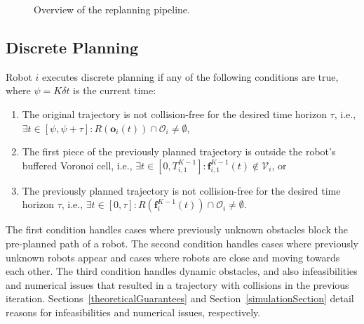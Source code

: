 \documentclass{svproc}
\newcommand{\vf}{\mathbf{f}}
\newcommand{\vo}{\mathbf{o}}
\newcommand{\cV}{\mathcal{V}}
\newcommand{\cO}{\mathcal{O}}
\begin{document}
\begin{figure}
{
}
\caption{Overview of the replanning pipeline.
}
\label{fig:flowchart}
\end{figure}

\subsection{Discrete Planning} \label{discretePlanning}
Robot $i$ executes discrete planning if any of the following conditions are true, where $\psi=K\delta t$ is the current time:
\begin{enumerate}
    \item The original trajectory is not collision-free for the desired time horizon $\tau$, i.e., $\exists t\in [\psi,\psi+\tau] : R(\vo_i(t)) \cap \cO_i \neq \emptyset$,
    \item The first piece of the previously planned trajectory is outside the robot's buffered Voronoi cell, i.e., $\exists t\in [0, T^{K-1}_{i,1}] : \vf^{K-1}_{i,1}(t) \not\in \cV_i$, or
    \item The previously planned trajectory is not collision-free for the desired time horizon $\tau$, i.e., $\exists t\in [0,\tau] :  R(\vf^{K-1}_i(t)) \cap \cO_i \neq \emptyset$.
\end{enumerate}
The first condition handles cases where previously unknown obstacles block the pre-planned path of a robot. The second condition handles cases where previously unknown robots appear and cases where robots are close and moving towards each other. The third condition handles dynamic obstacles, and  also infeasibilities and numerical issues that resulted in a trajectory with collisions in the previous iteration. 
Sections~\ref{theoreticalGuarantees} and Section~\ref{simulationSection} detail reasons for infeasibilities and  numerical issues, respectively.
\end{document}
